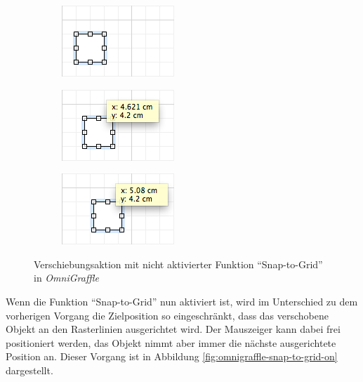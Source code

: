 \begin{figure}[hbt]
    \newcommand{\subfigurewidth}{0.33\textwidth}
    \newcommand{\graphicswidth}{0.95\linewidth}
    \begin{subfigure}{\subfigurewidth}
        \centering
        \includegraphics[width=\graphicswidth]{resources/omnigraffle-snap-to-grid-off-a}
        \caption{}
    \end{subfigure}
    \begin{subfigure}{\subfigurewidth}
        \centering
        \includegraphics[width=\graphicswidth]{resources/omnigraffle-snap-to-grid-off-b}
        \caption{}
    \end{subfigure}
    \begin{subfigure}{\subfigurewidth}
        \centering
        \includegraphics[width=\graphicswidth]{resources/omnigraffle-snap-to-grid-off-c}
        \caption{}
    \end{subfigure}
    \caption{Verschiebungsaktion mit nicht aktivierter Funktion \enquote{Snap-to-Grid} in \textit{OmniGraffle}}
    \label{fig:omnigraffle-snap-to-grid-off}
\end{figure}

Wenn die Funktion \enquote{Snap-to-Grid} nun aktiviert ist, wird im Unterschied zu dem vorherigen Vorgang die Zielposition so eingeschränkt, dass das verschobene Objekt an den Rasterlinien ausgerichtet wird. Der Mauszeiger kann dabei frei positioniert werden, das Objekt nimmt aber immer die nächste ausgerichtete Position an. Dieser Vorgang ist in Abbildung \ref{fig:omnigraffle-snap-to-grid-on} dargestellt.

